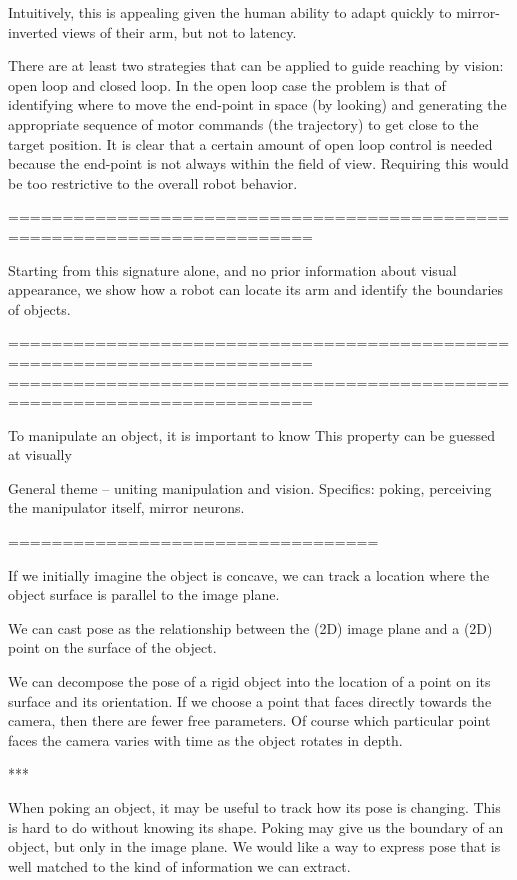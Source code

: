 Intuitively, this is appealing given the
human ability to adapt quickly to mirror-inverted views of their
arm, but not to latency.

There are at least two strategies that can be applied to
guide reaching by vision: open loop and closed loop. In the open loop
case the problem is that of identifying where to move the end-point in
space (by looking) and generating the appropriate sequence of motor
commands (the trajectory) to get close to the target position. It is
clear that a certain amount of open loop control is needed because the
end-point is not always within the field of view. Requiring this would
be too restrictive to the overall robot behavior. 

==========================================================================

Starting from this signature alone, and no prior information about
visual appearance, we show how a robot can locate its arm and
identify the boundaries of objects.

==========================================================================
==========================================================================



To manipulate an object, it is important to know
This property can be guessed at visually

General theme -- uniting manipulation and vision.
Specifics: poking, perceiving the manipulator itself, mirror neurons.

==================================

  If we initially imagine the object is
concave, we can track a location where the object surface is parallel
to the image plane.

We can cast pose as the relationship between the (2D) image plane and
a (2D) point on the surface of the object.

We can decompose the pose of a rigid object into the location of a
point on its surface and its orientation.  If we choose a point that
faces directly towards the camera, then there are fewer free
parameters.  Of course which particular point faces the camera varies
with time as the object rotates in depth.

   ***

When poking an object, it may be useful to track how its pose is
changing.  This is hard to do without knowing its shape.  Poking may
give us the boundary of an object, but only in the image plane.  We
would like a way to express pose that is well matched to the kind of
information we can extract.


